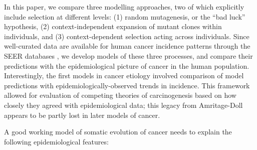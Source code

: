 \documentclass[10pt,twocolumn,twoside]{article}
\begin{document}
In this paper, we compare three modelling approaches, two of which explicitly include selection at different levels: (1) random mutagenesis, or the ``bad luck'' hypothesis, (2) context-independent expansion of mutant clones within individuals, and (3) context-dependent selection acting across individuals. Since well-curated data are available for human cancer incidence patterns through the SEER databases \cite{AmericanCancerSociety2016}, we develop models of these three processes, and compare their predictions with the epidemiological picture of cancer in the human population. Interestingly, the first models in cancer etiology involved comparison of model predictions with epidemiologically-observed trends in incidence. This framework allowed for evaluation of competing theories of carcinogenesis based on how closely they agreed with epidemiological data; this legacy from Amritage-Doll appears to be partly lost in later models of cancer.

A good working model of somatic evolution of cancer needs to explain the following epidemiological features:
\end{document}
